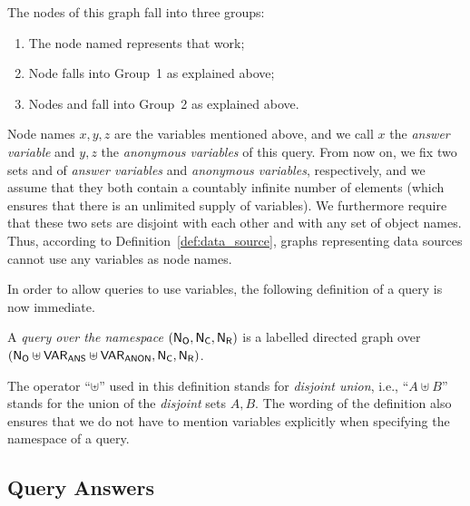 The nodes of this graph fall into three groups:
%
\begin{enumerate}[(1)]
  \item
    The node named  represents that work;
  \item
    Node  falls into Group~1 as explained above;
  \item
    Nodes  and 
    fall into Group~2 as explained above.
\end{enumerate}
%
Node names $x,y,z$ are the variables mentioned above,
and we call $x$ the \emph{answer variable} and $y,z$ the \emph{anonymous variables}
of this query.
From now on, we fix two sets \VARANS and \VARANON
of \emph{answer variables} and \emph{anonymous variables}, respectively,
and we assume that they both contain a countably infinite number of elements
(which ensures that there is an unlimited supply of variables).
We furthermore require that these two sets are disjoint with each other
and with any set \NO of object names.
Thus, according to Definition~\ref{def:data_source},
graphs representing data sources cannot use any variables as node names.

In order to allow queries to use variables,
the following definition of a query is now immediate. 
%
\begin{definition}
  A \emph{query over the namespace $(\mathsf{N}_\mathsf{O},\mathsf{N}_\mathsf{C},\mathsf{N}_\mathsf{R})$} is a labelled directed graph
  over $(\mathsf{N}_\mathsf{O} \uplus \mathsf{VAR}_\mathsf{ANS} \uplus \mathsf{VAR}_\mathsf{ANON}, \mathsf{N}_\mathsf{C}, \mathsf{N}_\mathsf{R})$.
\end{definition}
%
The operator \enquote{$\uplus$} used in this definition
stands for \emph{disjoint union}, i.e., \enquote{$A \uplus B$}
stands for the union of the \emph{disjoint} sets $A,B$.
The wording of the definition also ensures
that we do not have to mention variables explicitly when specifying the
namespace of a query.

\subsection{Query Answers}

